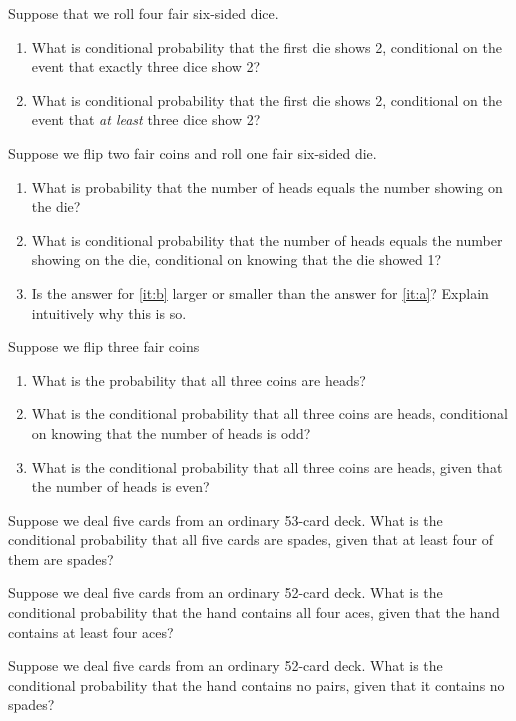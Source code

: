 \begin{exercises}
    \item Suppose that we roll four fair six-sided dice.
        \begin{enumerate}
            \item What is conditional probability that the first die shows 2, conditional on the event that exactly three dice show 2?
            \item What is conditional probability that the first die shows 2, conditional on the event that \emph{at least} three dice show 2?
        \end{enumerate}
    \item Suppose we flip two fair coins and roll one fair six-sided die.
        \begin{enumerate}
            \item What is probability that the number of heads equals the number showing on the die?\label{it:a}
            \item What is conditional probability that the number of heads equals the number showing on the die, conditional on knowing that the die showed 1?\label{it:b}
            \item Is the answer for \autoref{it:b} larger or smaller than the answer for \autoref{it:a}? Explain intuitively why this is so.
        \end{enumerate}
    \item Suppose we flip three fair coins
        \begin{enumerate}
            \item What is the probability that all three coins are heads?
            \item What is the conditional probability  that all three coins are heads, conditional on knowing that the number of heads is odd?
            \item What is the conditional probability that all three coins are heads, given that the number of heads is even?
        \end{enumerate}
    \item Suppose we deal five cards from an ordinary 53-card deck. What is the conditional probability that all five cards are spades, given that at least four of them are spades?
    \item Suppose we deal five cards from an ordinary 52-card deck. What is the conditional probability that the hand contains all four aces, given that the hand contains at least four aces?
    \item Suppose we deal five cards from an ordinary 52-card deck. What is the conditional probability that the hand contains no pairs, given that it contains no spades?

\end{exercises}
